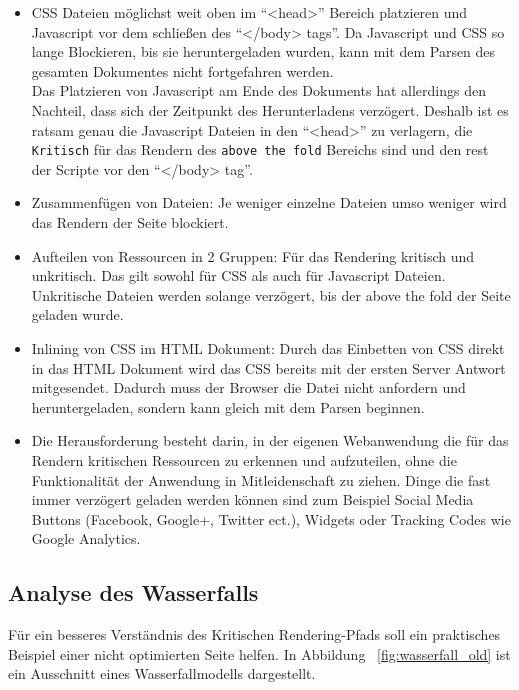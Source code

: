 			\begin{itemize}
				\item CSS Dateien möglichst weit oben im "`<head>"' Bereich platzieren und Javascript vor dem schließen des "`</body> tags"'. Da Javascript und CSS so lange Blockieren, bis sie heruntergeladen wurden, kann mit dem Parsen des gesamten Dokumentes nicht fortgefahren werden. \autocite{placingScripts}\\
				Das Platzieren von Javascript am Ende des Dokuments hat allerdings den Nachteil, dass sich der Zeitpunkt des Herunterladens verzögert. Deshalb ist es ratsam genau die Javascript Dateien in den "`<head>"' zu verlagern, die \texttt{Kritisch} für das Rendern des \texttt{above the fold} Bereichs sind und den rest der Scripte vor den "`</body> tag"'. 

				\item Zusammenfügen von Dateien: Je weniger einzelne Dateien umso weniger wird das Rendern der Seite blockiert.

				\item Aufteilen von Ressourcen in 2 Gruppen: Für das Rendering kritisch und unkritisch. Das gilt sowohl für CSS als auch für Javascript Dateien. Unkritische Dateien werden solange verzögert, bis der above the fold der Seite geladen wurde.

				\item Inlining von CSS im HTML Dokument: Durch das Einbetten von CSS direkt in das HTML Dokument wird das CSS bereits mit der ersten Server Antwort mitgesendet. Dadurch muss der Browser die Datei nicht anfordern und heruntergeladen, sondern kann gleich mit dem Parsen beginnen.

				\item Die Herausforderung besteht darin, in der eigenen Webanwendung die für das Rendern kritischen Ressourcen zu erkennen und aufzuteilen, ohne die Funktionalität der Anwendung in Mitleidenschaft zu ziehen. Dinge die fast immer verzögert geladen werden können sind zum Beispiel Social Media Buttons (Facebook, Google+, Twitter ect.), Widgets oder Tracking Codes wie Google Analytics.
			\end{itemize}



	\subsection{Analyse des Wasserfalls}
	\label{sub:analyse_des_wasserfalls}
		Für ein besseres Verständnis des Kritischen Rendering-Pfads soll ein praktisches Beispiel einer nicht optimierten Seite helfen. In Abbildung ~\ref{fig:wasserfall_old} ist ein Ausschnitt eines Wasserfallmodells dargestellt. 

